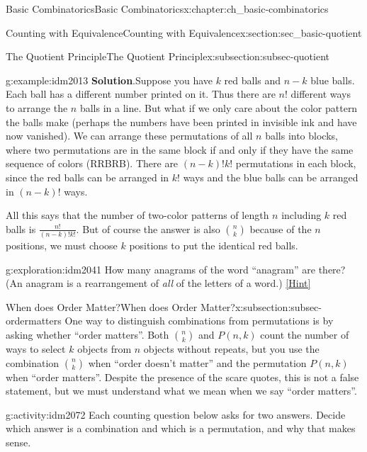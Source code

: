\documentclass[oneside,10pt,]{book}
\numberwithin{equation}{chapter}
\begin{document}
\begin{chapterptx}{Basic Combinatorics}{}{Basic Combinatorics}{}{}{x:chapter:ch_basic-combinatorics}
\begin{sectionptx}{Counting with Equivalence}{}{Counting with Equivalence}{}{}{x:section:sec_basic-quotient}
\begin{subsectionptx}{The Quotient Principle}{}{The Quotient Principle}{}{}{x:subsection:subsec-quotient}
\begin{example}{}{g:example:idm2013}
\noindent\textbf{Solution}.\hypertarget{g:solution:idm2023}{}\quad{}Suppose you have \(k\) red balls and \(n-k\) blue balls.  Each ball has a different number printed on it.  Thus there are \(n!\) different ways to arrange the \(n\) balls in a line.  But what if we only care about the color pattern the balls make (perhaps the numbers have been printed in invisible ink and have now vanished).  We can arrange these permutations of all \(n\) balls into blocks, where two permutations are in the same block if and only if they have the same sequence of colors (RRBRB\textellipsis{}).  There are \((n-k)!k!\) permutations in each block, since the red balls can be arranged in \(k!\) ways and the blue balls can be arranged in \((n-k)!\) ways.%
\par
All this says that the number of two-color patterns of length \(n\) including \(k\) red balls is \(\frac{n!}{(n-k)!k!}\).  But of course the answer is also \(\binom{n}{k}\) because of the \(n\) positions, we must choose \(k\) positions to put the identical red balls.%
\end{example}
\begin{exploration}{}{g:exploration:idm2041}%
How many anagrams of the word ``anagram'' are there? (An anagram is a rearrangement of \emph{all} of the letters of a word.)%
\space\hspace*{0pt}\hfill{\tiny\hyperlink{g:hint:idm2046-back}{[Hint]}}\end{exploration}
\end{subsectionptx}
%
%
\typeout{************************************************}
\typeout{************************************************}
%
\begin{subsectionptx}{When does Order Matter?}{}{When does Order Matter?}{}{}{x:subsection:subsec-ordermatters}
One way to distinguish combinations from permutations is by asking whether ``order matters''.  Both \(\binom{n}{k}\) and \(P(n,k)\) count the number of ways to select \(k\) objects from \(n\) objects without repeats, but you use the combination \(\binom{n}{k}\) when ``order doesn't matter'' and the permutation \(P(n,k)\) when ``order matters''.  Despite the presence of the scare quotes, this is not a false statement, but we must understand what we mean when we say ``order matters''.%
\begin{activity}{}{g:activity:idm2072}%
Each counting question below asks for two answers.  Decide which answer is a combination and which is a permutation, and why that makes sense.%
\begin{enumerate}[font=\bfseries,label=(\alph*),ref=\alph*]

\end{enumerate}
\end{activity}
\end{subsectionptx}
\end{sectionptx}
\end{chapterptx}
\end{document}
